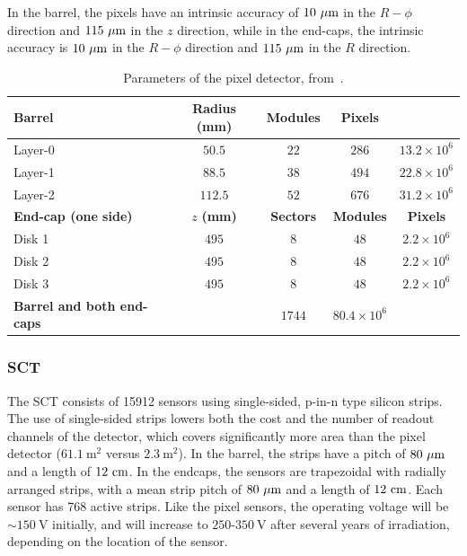 In the barrel, the pixels have an intrinsic accuracy of $10~\mu\mathrm{m}$ in the $R-\phi$ direction and $115~\mu\mathrm{m}$ in the $z$ direction, while in the end-caps, the intrinsic accuracy is $10~\mu\mathrm{m}$ in the $R-\phi$ direction and $115~\mu\mathrm{m}$ in the $R$ direction.

\begin{table}[htbp]
	\centering
	\begin{tabular}{|l|c|c|c|c|}
		\hline
		\textbf{Barrel} & \textbf{Radius (mm)} & \textbf{Modules} & \textbf{Pixels} \\
		\hline
		Layer-0 & $50.5$ & $22$ & $286$ & $13.2\times 10^6$ \\
		Layer-1 & $88.5$ & $38$ & $494$ & $22.8\times 10^6$ \\
		Layer-2 & $112.5$ & $52$ & $676$ & $31.2\times 10^6$ \\
		\hline
		\textbf{End-cap (one side)} & $z$ \textbf{(mm)} & \textbf{Sectors} & \textbf{Modules} & \textbf{Pixels} \\
		\hline
		Disk 1 & $495$ & $8$ & $48$ & $2.2\times 10^6$ \\
		Disk 2 & $495$ & $8$ & $48$ & $2.2\times 10^6$ \\
		Disk 3 & $495$ & $8$ & $48$ & $2.2\times 10^6$ \\
		\hline
		\textbf{Barrel and both end-caps} & & $1744$ & $80.4\times 10^6$ \\
		\hline
	\end{tabular}
	\caption{Parameters of the pixel detector, from~\cite{TheATLASCollaboration:2008fg}.}
	\label{table:ATLAS-pixel-layout}
\end{table}

\subsubsection{SCT}\label{sec:ATLAS-id-sct}

The SCT consists of 15912 sensors using single-sided, p-in-n type silicon strips. The use of single-sided strips lowers both the cost and the number of readout channels of the detector, which covers significantly more area than the pixel detector ($61.1~\mbox{m}^2$ versus $2.3~\mbox{m}^2$). In the barrel, the strips have a pitch of $80~\mu\mathrm{m}$ and a length of $12~\mathrm{cm}$. In the endcaps, the sensors are trapezoidal with radially arranged strips, with a mean strip pitch of $80~\mu\mathrm{m}$ and a length of $12~\mathrm{cm}$. Each sensor has 768 active strips. Like the pixel sensors, the operating voltage will be $\sim150~\mbox{V}$ initially, and will increase to $250$-$350~\mbox{V}$ after several years of irradiation, depending on the location of the sensor. 

